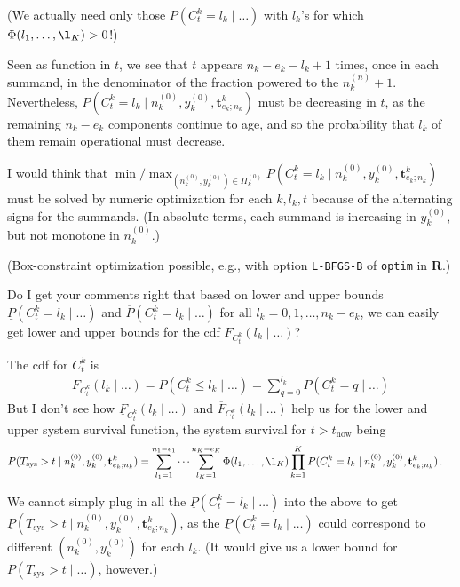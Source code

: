 \documentclass[12pt,a4paper,fleqn]{narms}
\newcommand{\mbf}[1]{\mathbf{#1}}
\newcommand{\uz}{^{(0)}} %
\newcommand{\un}{^{(n)}} %
\newcommand{\ul}[1]{\underline{#1}}
\newcommand{\ol}[1]{\overline{#1}}
\def\Tsys{T_\text{sys}}
\def\ykz{y\uz_k}
\def\nkz{n\uz_k}
\def\nkn{n\un_k}
\def\PkZ{\Pi\uz_k}
\def\tnow{t_\text{now}}
\begin{document}
(We actually need only those $P(C^k_t = l_k\mid \ldots)$ with $l_k$'s
for which $\Phi(l_1,\ldots,\l_K) > 0$!)


Seen as function in $t$, we see that $t$ appears $n_k-e_k-l_k+1$ times,
once in each summand, in the denominator of the fraction powered to the $\nkn+1$.
Nevertheless, $P(C^k_t = l_k\mid\nkz,\ykz, \mbf{t}^k_{e_k;n_k})$
must be decreasing in $t$, as the remaining $n_k-e_k$ components continue to age,
and so the probability that $l_k$ of them remain operational must decrease.

I would think that
$\min / \max_{(\nkz,\ykz) \in \PkZ} P(C^k_t = l_k\mid\nkz,\ykz, \mbf{t}^k_{e_k;n_k})$
must be solved by numeric optimization for each $k, l_k, t$ 
because of the alternating signs for the summands.
(In absolute terms, each summand is increasing in $\ykz$, but not monotone in $\nkz$.)

(Box-constraint optimization possible, e.g., with option \texttt{L-BFGS-B} of \texttt{optim} in \textbf{R}.)

Do I get your comments right that based on lower and upper bounds
$\ul{P}(C^k_t = l_k\mid \ldots)$ and $\ol{P}(C^k_t = l_k\mid \ldots)$ for all $l_k = 0, 1, \ldots, n_k - e_k$,
we can easily get lower and upper bounds for the cdf $F_{C^k_t}(l_k \mid \ldots)$?

The cdf for $C^k_t$ is 
\begin{align}
F_{C^k_t}(l_k \mid \ldots) = P(C^k_t \leq l_k\mid\ldots) = \sum_{q=0}^{l_k} P(C^k_t = q\mid\ldots)
\end{align} 
But I don't see how $\ul{F}_{C^k_t}(l_k \mid \ldots)$ and $\ol{F}_{C^k_t}(l_k \mid \ldots)$
help us for the lower and upper system survival function,
the system survival for $t > \tnow$ being
\begin{align}
P(\Tsys > t\mid\nkz,\ykz, \mbf{t}^k_{e_k;n_k})
 &= \sum_{l_1=1}^{n_1-e_1} \cdots \sum_{l_K=1}^{n_K-e_K} \Phi(l_1,\ldots,\l_K) \prod_{k=1}^K
    P(C^k_t = l_k\mid\nkz,\ykz, \mbf{t}^k_{e_k;n_k}) \,.
\end{align}

We cannot simply plug in all the $\ul{P}(C^k_t = l_k\mid \ldots)$ %
into the above to get $\ul{P}(\Tsys > t\mid\nkz,\ykz, \mbf{t}^k_{e_k;n_k})$, %
as the $\ul{P}(C^k_t = l_k\mid \ldots)$ could correspond to different $(\nkz,\ykz)$ for each $l_k$.
(It would give us a lower bound for $\ul{P}(\Tsys > t\mid\ldots)$, however.)
\end{document}
